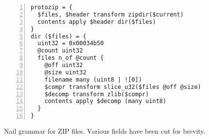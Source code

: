 \begin{figure}
\smaller[1.0]
\begin{Verbatim}[numbers=left, xleftmargin=3em]
protozip = { 
  $files, $header transform zipdir($current)
  contents apply $header dir($files)
}
dir ($files) = {
  uint32 = 0x00034b50
  @count uint32
  files n_of @count {
    @off uint32
    @size uint32
    filename many (uint8 | ![0])
    $compr transform slice_u32($files @off @size)
    $decomp transform zlib($compr)
    contents apply $decomp (many uint8)
  }
}
\end{Verbatim}
\caption{Nail grammar for ZIP files. Various fields have been cut for brevity.}
\label{fig:zip-extract}
\end{figure}
